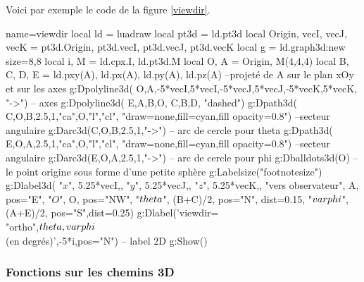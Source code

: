 Voici par exemple le code de la figure \ref{viewdir}.

\begin{Luacode}
\begin{luadraw}{name=viewdir}
local ld = luadraw
local pt3d = ld.pt3d
local Origin, vecI, vecJ, vecK = pt3d.Origin, pt3d.vecI, pt3d.vecJ, pt3d.vecK 
local g = ld.graph3d:new{ size={8,8} }
local i, M = ld.cpx.I, ld.pt3d.M
local O, A = Origin, M(4,4,4)
local B, C, D, E = ld.pxy(A), ld.px(A), ld.py(A), ld.pz(A) --projeté de A sur le plan xOy et sur les axes
g:Dpolyline3d( {{O,A},{-5*vecI,5*vecI},{-5*vecJ,5*vecJ},{-5*vecK,5*vecK}}, "->") -- axes
g:Dpolyline3d( {{E,A,B,O}, {C,B,D}}, "dashed")
g:Dpath3d( {C,O,B,2.5,1,"ca",O,"l","cl"}, "draw=none,fill=cyan,fill opacity=0.8") --secteur angulaire
g:Darc3d(C,O,B,2.5,1,"->") -- arc de cercle pour theta
g:Dpath3d( {E,O,A,2.5,1,"ca",O,"l","cl"}, "draw=none,fill=cyan,fill opacity=0.8") --secteur angulaire
g:Darc3d(E,O,A,2.5,1,"->") -- arc de cercle pour phi
g:Dballdots3d(O) -- le point origine sous forme d'une petite sphère
g:Labelsize("footnotesize")
g:Dlabel3d(
  "$x$", 5.25*vecI,{}, "$y$", 5.25*vecJ,{}, "$z$", 5.25*vecK,{},
  "vers observateur", A, {pos="E"},
  "$O$", O, {pos="NW"},
  "$\\theta$", (B+C)/2, {pos="N", dist=0.15},
  "$\\varphi$", (A+E)/2, {pos="S",dist=0.25})
g:Dlabel('viewdir=\\{"ortho",$\\theta,\\varphi$\\} (en degrés)',-5*i,{pos="N"}) -- label 2D
g:Show()
\end{luadraw}
\end{Luacode}

\subsubsection{Fonctions sur les chemins 3D}

